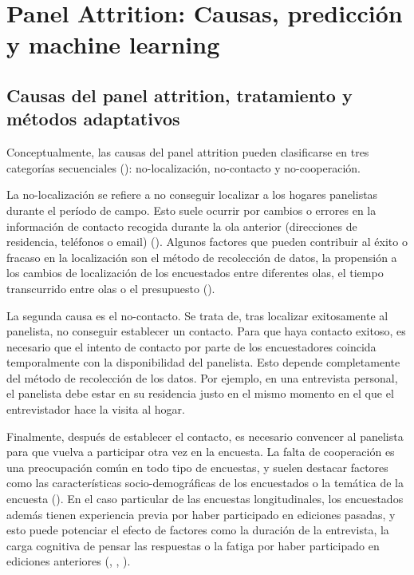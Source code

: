 \chapter{Panel Attrition: Causas, predicción y machine learning}
\label{chapter:attrition}
\section{Causas del panel attrition, tratamiento y métodos adaptativos}

Conceptualmente, las causas del panel attrition pueden clasificarse en tres categorías secuenciales (\cite{lepkowski2002nonresponse}): no-localización, no-contacto y no-cooperación.

La no-localización se refiere a no conseguir localizar a los hogares panelistas durante el período de campo. Esto suele ocurrir por cambios o errores en la información de contacto recogida durante la ola anterior (direcciones de residencia, teléfonos o email) (\cite{couper2009keeping}). Algunos factores que pueden contribuir al éxito o fracaso en la localización son el método de recolección de datos, la propensión a los cambios de localización de los encuestados entre diferentes olas, el tiempo transcurrido entre olas o el presupuesto (\cite{lynn2009methods}).

La segunda causa es el no-contacto. Se trata de, tras localizar exitosamente al panelista, no conseguir establecer un contacto. Para que haya contacto exitoso, es necesario que el intento de contacto por parte de los encuestadores coincida temporalmente con la disponibilidad del panelista. Esto depende completamente del método de recolección de los datos. Por ejemplo, en una entrevista personal, el panelista debe estar en su residencia justo en el mismo momento en el que el entrevistador hace la visita al hogar.

Finalmente, después de establecer el contacto, es necesario convencer al panelista para que vuelva a participar otra vez en la encuesta. La falta de cooperación es una preocupación común en todo tipo de encuestas, y suelen destacar factores como las características socio-demográficas de los encuestados o la temática de la encuesta (\cite{groves1992understanding}). En el caso particular de las encuestas longitudinales, los encuestados además tienen experiencia previa por haber participado en ediciones pasadas, y esto puede potenciar el efecto de factores como la duración de la entrevista, la carga cognitiva de pensar las respuestas o la fatiga por haber participado en ediciones anteriores (\cite{laurie1999strategies}, \cite{watson2009identifying}, \cite{lynn2018tackling}).

